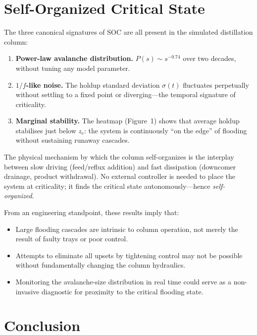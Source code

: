\documentclass[twocolumn,12pt]{article}
\begin{document}
\section{Self-Organized Critical State}

The three canonical signatures of SOC are all present in the simulated
distillation column:

\begin{enumerate}
  \item \textbf{Power-law avalanche distribution.}  $P(s) \sim s^{-0.74}$
        over two decades, without tuning any model parameter.
  \item \textbf{$1/f$-like noise.}  The holdup standard deviation
        $\sigma(t)$ fluctuates perpetually without settling to a fixed
        point or diverging---the temporal signature of criticality.
  \item \textbf{Marginal stability.}  The heatmap (Figure~1) shows that
        average holdup stabilises just below $z_c$: the system is
        continuously ``on the edge'' of flooding without sustaining
        runaway cascades.
\end{enumerate}

The physical mechanism by which the column self-organizes is the
interplay between slow driving (feed/reflux addition) and fast
dissipation (downcomer drainage, product withdrawal).  No external
controller is needed to place the system at criticality; it finds the
critical state autonomously---hence \textit{self-organized}.

From an engineering standpoint, these results imply that:
\begin{itemize}
  \item Large flooding cascades are intrinsic to column operation, not
        merely the result of faulty trays or poor control.
  \item Attempts to eliminate all upsets by tightening control may not
        be possible without fundamentally changing the column hydraulics.
  \item Monitoring the avalanche-size distribution in real time could
        serve as a non-invasive diagnostic for proximity to the critical
        flooding state.
\end{itemize}

\section{Conclusion}
\end{document}
